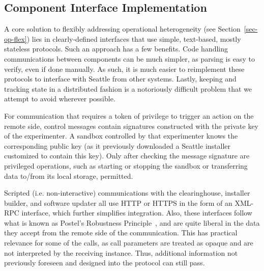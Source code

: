%



\subsection{Component Interface Implementation}

A core solution to flexibly addressing operational heterogeneity (see
Section~\ref{sec-op-flex}) lies in clearly-defined interfaces
that use simple, text-based, mostly stateless protocols.
Such an approach has a few benefits. Code handling communications between
components can be much simpler, as parsing is easy to verify,
even if done manually. As such, it is much easier to reimplement these protocols
to interface with Seattle from other systems. Lastly, keeping
and tracking state in a distributed fashion is a notoriously
difficult problem that we attempt to avoid wherever possible.

For communication that requires a token of privilege to trigger
an action on the remote side, control messages contain signatures
constructed with the private key of the experimenter. A
sandbox controlled by that experimenter knows the
corresponding public key (as it previously downloaded a Seattle installer
customized to contain this key). Only after checking
the message signature are privileged operations, such as starting
or stopping the sandbox or transferring data to/from its
local storage, permitted.

Scripted (i.e. non-interactive) communications with the
clearinghouse, installer builder, and software updater all
use \gls{HTTP} or \gls{HTTPS} in the form of an
\acrshort{XML}-\acrshort{RPC} interface, which further simplifies
integration. Also, these interfaces
follow what is known as Postel's Robustness
Principle~\cite[\S2.10]{rfc793}, and are quite liberal in the
data they accept from the remote side of the communication.
This has practical relevance for some of the calls, as
call parameters are treated as opaque and are not
interpreted by the receiving instance. Thus, additional
information not previously foreseen and designed into the
protocol can still pass.
